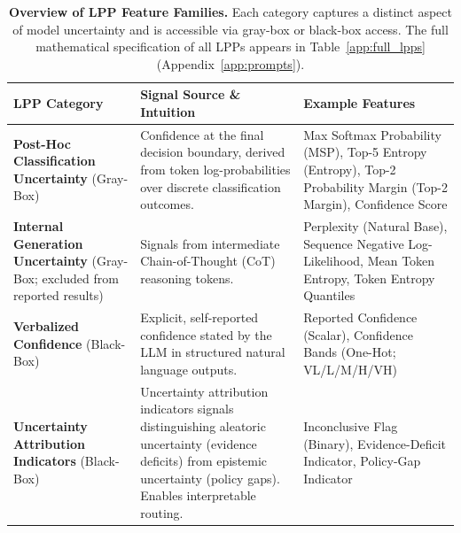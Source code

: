 \begin{table}[h]
\centering
\caption{\textbf{Overview of LPP Feature Families.} Each category captures a distinct aspect of model uncertainty and is accessible via gray-box or black-box access. The full mathematical specification of all LPPs appears in Table~\ref{app:full_lpps} (Appendix~\ref{app:prompts}).}
\small
\setlength{\tabcolsep}{3.5pt}
\renewcommand{\arraystretch}{1.05}
\begin{tabularx}{\columnwidth}{@{}%
  >{\raggedright\arraybackslash}p{}%
  >{\raggedright\arraybackslash}X%
  >{\raggedright\arraybackslash}p{}%
@{}}
\toprule
\textbf{LPP Category} & \textbf{Signal Source \& Intuition} & \textbf{Example Features} \\
\midrule
\textbf{Post-Hoc Classification Uncertainty} (Gray-Box) &
Confidence at the final decision boundary, derived from token log-probabilities over discrete classification outcomes. &
Max Softmax Probability (MSP), Top-5 Entropy (Entropy), Top-2 Probability Margin (Top-2 Margin), Confidence Score \\
\midrule
\textbf{Internal Generation Uncertainty} (Gray-Box; excluded from reported results) &
Signals from intermediate Chain-of-Thought (CoT) reasoning tokens. &
Perplexity (Natural Base), Sequence Negative Log-Likelihood, Mean Token Entropy, Token Entropy Quantiles \\
\midrule
\textbf{Verbalized Confidence} (Black-Box) &
Explicit, self-reported confidence stated by the LLM in structured natural language outputs. &
Reported Confidence (Scalar), Confidence Bands (One-Hot; VL/L/M/H/VH) \\
\midrule
\textbf{Uncertainty Attribution Indicators} (Black-Box) &
Uncertainty attribution indicators signals distinguishing aleatoric uncertainty (evidence deficits) from epistemic uncertainty (policy gaps). Enables interpretable routing. &
Inconclusive Flag (Binary), Evidence-Deficit Indicator, Policy-Gap Indicator \\
\bottomrule
\end{tabularx}
\label{tab:lpps}
\end{table}
\vspace{-11pt}
